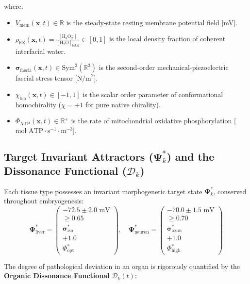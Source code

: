 \documentclass[10pt,twocolumn]{article}
\begin{document}
where:
\begin{itemize}
  \item $V_{\text{mem}}(\mathbf{x}, t) \in \mathbb{R}$ is the steady-state resting membrane potential field [mV].
  \item $\rho_{\text{EZ}}(\mathbf{x}, t) = \frac{[\text{H}_3\text{O}_2^-]}{[\text{H}_2\text{O}]_{\text{total}}} \in [0, 1]$ is the local density fraction of coherent interfacial water.
  \item $\boldsymbol{\sigma}_{\text{fascia}}(\mathbf{x}, t) \in \text{Sym}^2(\mathbb{R}^3)$ is the second-order mechanical-piezoelectric fascial stress tensor [$\text{N/m}^2$].
  \item $\chi_{\text{bio}}(\mathbf{x}, t) \in [-1, 1]$ is the scalar order parameter of conformational homochirality ($\chi = +1$ for pure native chirality).
  \item $\Phi_{\text{ATP}}(\mathbf{x}, t) \in \mathbb{R}^+$ is the rate of mitochondrial oxidative phosphorylation [$\text{mol ATP}\cdot\text{s}^{-1}\cdot\text{m}^{-3}$].
\end{itemize}


\subsection{Target Invariant Attractors ($\mathbf{\Psi}^*_k$) and the Dissonance Functional ($\mathcal{D}_k$)}

Each tissue type possesses an invariant morphogenetic target state $\mathbf{\Psi}^*_k$, conserved throughout embryogenesis:
\begin{equation}
  \mathbf{\Psi}^*_{\text{liver}} = \begin{pmatrix} -72.5 \pm 2.0\text{ mV} \\ \ge 0.65 \\ \boldsymbol{\sigma}^*_{\text{iso}} \\ +1.0 \\ \Phi^*_{\text{opt}} \end{pmatrix}, \quad \mathbf{\Psi}^*_{\text{neuron}} = \begin{pmatrix} -70.0 \pm 1.5\text{ mV} \\ \ge 0.70 \\ \boldsymbol{\sigma}^*_{\text{axon}} \\ +1.0 \\ \Phi^*_{\text{high}} \end{pmatrix}
\end{equation}

The degree of pathological deviation in an organ is rigorously quantified by the \textbf{Organic Dissonance Functional} $\mathcal{D}_k(t)$:
\end{document}
